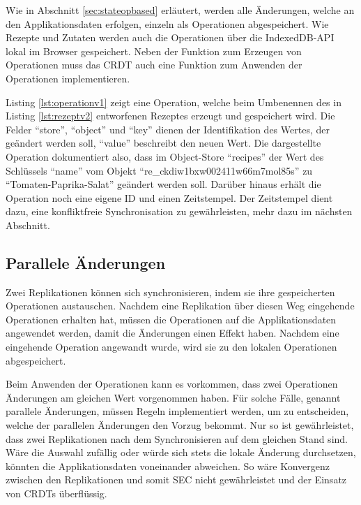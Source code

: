 \documentclass[a4paper, 12pt]{scrreprt}
\begin{document}
Wie in Abschnitt \ref{sec:stateopbased} erläutert, werden alle Änderungen, welche an den Applikationsdaten erfolgen, einzeln als Operationen abgespeichert. Wie Rezepte und Zutaten werden auch die Operationen über die IndexedDB-API lokal im Browser gespeichert. Neben der Funktion zum Erzeugen von Operationen muss das CRDT auch eine Funktion zum Anwenden der Operationen implementieren. 

Listing \ref{lst:operationv1} zeigt eine Operation, welche beim Umbenennen des in Listing \ref{lst:rezeptv2} entworfenen Rezeptes erzeugt und gespeichert wird. Die Felder \enquote{store}, \enquote{object} und  \enquote{key} dienen der Identifikation des Wertes, der geändert werden soll, \enquote{value} beschreibt den neuen Wert. Die dargestellte Operation dokumentiert also, dass im Object-Store \enquote{recipes} der Wert des Schlüssels \enquote{name} vom Objekt \enquote{re\_ckdiw1bxw002411w66m7mol85s} zu \enquote{Tomaten-Paprika-Salat} geändert werden soll. Darüber hinaus erhält die Operation noch eine eigene ID und einen Zeitstempel. Der Zeitstempel dient dazu, eine konfliktfreie Synchronisation zu gewährleisten, mehr dazu im nächsten Abschnitt. 

\begin{minipage}{\linewidth}
	
\end{minipage}

\subsection{Parallele Änderungen}
\label{sec:paralleleÄnderungen}

Zwei Replikationen können sich synchronisieren, indem sie ihre gespeicherten Operationen austauschen. Nachdem eine Replikation über diesen Weg eingehende Operationen erhalten hat, müssen die Operationen auf die Applikationsdaten angewendet werden, damit die Änderungen einen Effekt haben. Nachdem eine eingehende Operation angewandt wurde, wird sie zu den lokalen Operationen abgespeichert.

Beim Anwenden der Operationen kann es vorkommen, dass zwei Operationen Änderungen am gleichen Wert vorgenommen haben. Für solche Fälle, genannt parallele Änderungen, müssen Regeln implementiert werden, um zu entscheiden, welche der parallelen Änderungen den Vorzug bekommt. Nur so ist gewährleistet, dass zwei Replikationen nach dem Synchronisieren auf dem gleichen Stand sind. Wäre die Auswahl zufällig oder würde sich stets die lokale Änderung durchsetzen, könnten die Applikationsdaten voneinander abweichen. So wäre Konvergenz zwischen den Replikationen und somit \ac{SEC} nicht gewährleistet und der Einsatz von \acp{CRDT} überflüssig.
\end{document}
